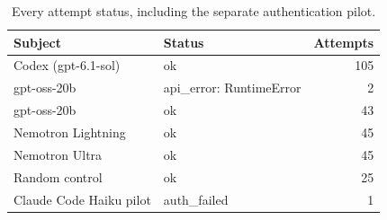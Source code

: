 \begin{table}[tbp]
\centering\small
\setlength{\tabcolsep}{4pt}
\caption{Every attempt status, including the separate authentication pilot.}\label{tab:failures}
\begin{tabular}{llr}
\toprule
Subject & Status & Attempts \\
\midrule
Codex (gpt-6.1-sol) & ok & 105 \\
gpt-oss-20b & api\_error: RuntimeError & 2 \\
gpt-oss-20b & ok & 43 \\
Nemotron Lightning & ok & 45 \\
Nemotron Ultra & ok & 45 \\
Random control & ok & 25 \\
Claude Code Haiku pilot & auth\_failed & 1 \\
\bottomrule
\end{tabular}
\end{table}
